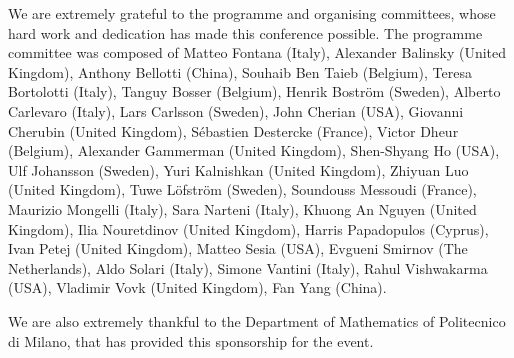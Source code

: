 \documentclass[twoside,11pt]{article}
\begin{document}
We are extremely grateful to the programme and organising committees, whose hard work and dedication has made this conference possible. The programme committee was composed of Matteo Fontana (Italy), Alexander Balinsky (United Kingdom), Anthony Bellotti (China), Souhaib Ben Taieb (Belgium), Teresa Bortolotti (Italy), Tanguy Bosser (Belgium), Henrik Boström (Sweden), Alberto Carlevaro (Italy), Lars Carlsson (Sweden), John Cherian (USA), Giovanni Cherubin (United Kingdom), Sébastien Destercke (France), Victor Dheur (Belgium), Alexander Gammerman (United Kingdom), Shen-Shyang Ho (USA), Ulf Johansson (Sweden), Yuri Kalnishkan (United Kingdom), Zhiyuan Luo (United Kingdom), Tuwe Löfström (Sweden), Soundouss Messoudi (France), Maurizio Mongelli (Italy), Sara Narteni (Italy), Khuong An Nguyen (United Kingdom), Ilia Nouretdinov (United Kingdom), Harris Papadopulos (Cyprus), Ivan Petej (United Kingdom), Matteo Sesia (USA), Evgueni Smirnov (The Netherlands), Aldo Solari (Italy), Simone Vantini (Italy), Rahul Vishwakarma (USA), Vladimir Vovk (United Kingdom), Fan Yang (China).

We are also extremely thankful to the Department of Mathematics of Politecnico di Milano, that has provided this sponsorship for the event.
\end{document}
